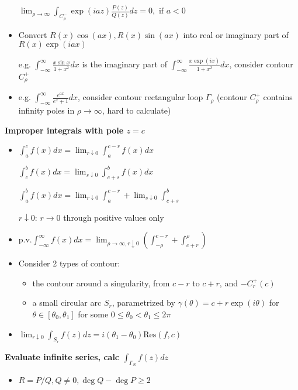 \documentclass[10pt,a4paper]{article}
\begin{document}
\begin{multicols}{2}
\begin{itemize}
  $\lim_{\rho \to \infty} \int_{C_\rho^-}\exp(iaz)\frac{P(z)}{Q(z)}dz=0, \text{ if } a<0$

\item Convert $R(x)\cos(ax), R(x)\sin(ax)$ into real or imaginary part of $R(x)\exp(iax)$
  
  e.g. $\displaystyle \int_{-\infty}^\infty \frac{x\sin x}{1+x^2}dx$ is the imaginary part of $\displaystyle \int_{-\infty}^\infty \frac{x\exp(ix)}{1+x^2}dx$, consider contour $C_\rho^+$
\item e.g. $ \displaystyle \int_{-\infty}^\infty \frac{e^{ax}}{e^x+1}dx$,  consider contour rectangular loop $\Gamma_\rho$ (contour $C_\rho^+$ contains infinity poles in $\rho \to \infty$, hard to calculate)
\end{itemize}

\textbf{Improper integrals with pole $z=c$}

\begin{itemize}
    \item $\int_a^c f(x)dx= \lim_{r \downarrow 0} \int_a^{c-r} f(x)dx$
  

  $ \int_c^b f(x)dx= \lim_{s \downarrow 0} \int_{c+s}^b f(x)dx$

  $\int_a^b f(x)dx= \lim_{r \downarrow 0} \int_a^{c-r} + \lim_{s \downarrow 0} \int_{c+s}^b $

  $r \downarrow 0$: $r\to 0$ through positive values only

\item $\text{p.v.} \int_{-\infty}^\infty f(x)dx = \lim_{\rho \to \infty, r\downarrow 0} \left( \int_{-\rho}^{c-r}  + \int_{c+r}^\rho  \right)$
\item Consider 2 types of contour:
\begin{itemize}
    \item the contour around a singularity, from $c-r$ to $c+r$, and $-C_r^+(c)$
    \item a small circular arc $S_r$, parametrized by $\gamma(\theta)=c+r\exp(i\theta)$ for $\theta \in [\theta_0,\theta_1]$ for some $0 \leq \theta_0 < \theta_1 \leq 2\pi$
\end{itemize}

\item $\lim_{r \downarrow 0} \int_{S_r}f(z)dz = i(\theta_1-\theta_0) \text{Res}(f,c)$    
\end{itemize}

\textbf{Evaluate infinite series, calc $\int_{\Gamma_N} f(z)dz$}

\begin{itemize}
\item $R=P/Q, Q \neq 0, \deg Q-\deg P \geq 2$


\end{itemize}
\end{multicols}
\end{document}
